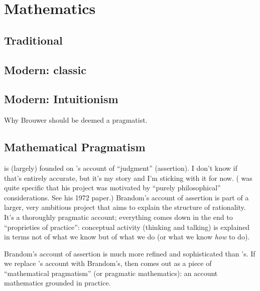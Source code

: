 \section{Mathematics}
\label{sect:math}

\subsection{Traditional}
\label{subs:mathtrad}

\subsection{Modern: classic}
\label{subs:mathmodclassic}

\subsection{Modern: Intuitionism}
\label{sect:mathmodintuit}

\begin{ednote}
  Why Brouwer should be deemed a pragmatist.
\end{ednote}


\subsection{Mathematical Pragmatism}
\label{sect:mathprag}

\begin{ednote}
  \HoTT is (largely) founded on \ML{}'s account of ``judgment''
  (assertion).  I don't know if that's entirely accurate, but it's my
  story and I'm sticking with it for now.  (\ML{} was quite specific
  that his project was motivated by ``purely philosophical''
  considerations.  See his 1972 paper.)  Brandom's account of
  assertion is part of a larger, very ambitious project that aims to
  explain the structure of rationality.  It's a thoroughly pragmatic
  account; everything comes down in the end to ``proprieties of
  practice'': conceptual activity (thinking and talking) is explained
  in terms not of what we know but of what we do (or what we know
  \textit{how} to do).

  Brandom's account of assertion is much more refined and
  sophisticated than \ML{}'s.  If we replace \ML{}'s account with
  Brandom's, then \HoTT comes out as a piece of ``mathematical
  pragmatism'' (or pragmatic mathematics): an account mathematics
  grounded in practice.
\end{ednote}

